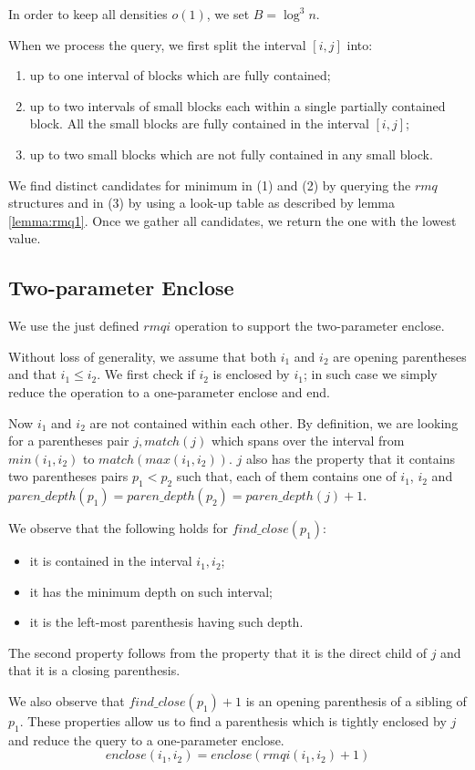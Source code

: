 In order to keep all densities $o(1)$, we set $B = \log^3 n$.

When we process the query, we first split the interval $[i, j]$ into:
\begin{enumerate}
	\item up to one interval of blocks which are fully contained;
	\item up to two intervals of small blocks each within a single partially contained block.
	All the small blocks are fully contained in the interval $[i, j]$;
	\item up to two small blocks which are not fully contained in any small block.
\end{enumerate}

We find distinct candidates for minimum in (1) and (2) by querying the $rmq$ structures and in (3) by using a look-up table as described by lemma \ref{lemma:rmq1}.
Once we gather all candidates, we return the one with the lowest value.

\subsection{\label{ss:enclose2}Two-parameter Enclose}

We use the just defined $rmqi$ operation to support the two-parameter enclose.

Without loss of generality, we assume that both $i_1$ and $i_2$ are opening parentheses and that $i_1 \le i_2$.
We first check if $i_2$ is enclosed by $i_1$; in such case we simply reduce the operation to a one-parameter enclose and end.

Now $i_1$ and $i_2$ are not contained within each other.
By definition, we are looking for a parentheses pair $j, match(j)$ which spans over the interval from $min(i_1, i_2)$ to $match(max(i_1, i_2))$.
$j$ also has the property that it contains two parentheses pairs $p_1 < p_2$ such that, each of them contains one of $i_1$, $i_2$ and $paren\_depth(p_1) = paren\_depth(p_2) = paren\_depth(j) + 1$.

We observe that the following holds for $find\_close(p_1)$:
\begin{itemize}
	\item it is contained in the interval $i_1, i_2$;
	\item it has the minimum depth on such interval;
	\item it is the left-most parenthesis having such depth.
\end{itemize}
The second property follows from the property that it is the direct child of $j$ and that it is a closing parenthesis.

We also observe that $find\_close(p_1) + 1$ is an opening parenthesis of a sibling of $p_1$.
These properties allow us to find a parenthesis which is tightly enclosed by $j$ and reduce the query to a one-parameter enclose.
$$ enclose(i_1, i_2) = enclose(rmqi(i_1, i_2) + 1) $$